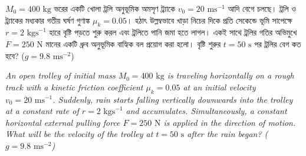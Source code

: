 \documentclass[12pt, a4paper]{article}
\begin{document}
\newpage

\begin{tcolorbox}[questionbox={প্রশ্ন (Question) 37}]
\noindent
$M_0 = 400\text{ kg}$ ভরের একটি খোলা ট্রলি অনুভূমিক অমসৃণ ট্র্যাকে $v_0 = 20\text{ ms}^{-1}$ আদি বেগে চলছে। ট্রলি ও ট্র্যাকের মধ্যকার গতীয় ঘর্ষণ গুণাঙ্ক $\mu_k = 0.05$। হঠাৎ উল্লম্বভাবে খাড়া নিচের দিকে প্রতি সেকেন্ডে ভূমি সাপেক্ষে $r = 2\text{ kgs}^{-1}$ হারে বৃষ্টি পড়তে শুরু করল এবং ট্রলিতে পানি জমা হতে লাগল। একই সাথে ট্রলির গতির অভিমুখে $F = 250\text{ N}$ মানের একটি ধ্রুব অনুভূমিক বাহ্যিক বল প্রয়োগ করা হলো। বৃষ্টি শুরুর $t = 50\text{ s}$ পর ট্রলির বেগ কত হবে? ($g = 9.8\text{ ms}^{-2}$)
\vspace{0.8em}
\begin{english}
\noindent\textit{\color{darkgray}
An open trolley of initial mass $M_0 = 400\text{ kg}$ is traveling horizontally on a rough track with a kinetic friction coefficient $\mu_k = 0.05$ at an initial velocity $v_0 = 20\text{ ms}^{-1}$. Suddenly, rain starts falling vertically downwards into the trolley at a constant rate of $r = 2\text{ kgs}^{-1}$ and accumulates. Simultaneously, a constant horizontal external pulling force $F = 250\text{ N}$ is applied in the direction of motion. What will be the velocity of the trolley at $t = 50\text{ s}$ after the rain began? ($g = 9.8\text{ ms}^{-2}$)
}
\end{english}
\end{tcolorbox}
\end{document}
